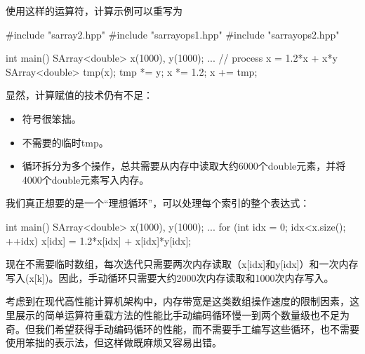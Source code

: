 使用这样的运算符，计算示例可以重写为

\begin{cpp}
#include "sarray2.hpp"
#include "sarrayops1.hpp"
#include "sarrayops2.hpp"

int main() {
	SArray<double> x(1000), y(1000);
	...
	// process x = 1.2*x + x*y
	SArray<double> tmp(x);
	tmp *= y;
	x *= 1.2;
	x += tmp;
}
\end{cpp}

显然，计算赋值的技术仍有不足：

\begin{itemize}
\item 
符号很笨拙。

\item 
不需要的临时tmp。

\item 
循环拆分为多个操作，总共需要从内存中读取大约6000个double元素，并将4000个double元素写入内存。
\end{itemize}

我们真正想要的是一个“理想循环”，可以处理每个索引的整个表达式：

\begin{cpp}
int main() {
	SArray<double> x(1000), y(1000);
	...
	for (int idx = 0; idx<x.size(); ++idx) {
		x[idx] = 1.2*x[idx] + x[idx]*y[idx];
	}
}
\end{cpp}

现在不需要临时数组，每次迭代只需要两次内存读取（x[idx]和y[idx]）和一次内存写入(x[k])。因此，手动循环只需要大约2000次内存读取和1000次内存写入。

考虑到在现代高性能计算机架构中，内存带宽是这类数组操作速度的限制因素，这里展示的简单运算符重载方法的性能比手动编码循环慢一到两个数量级也不足为奇。但我们希望获得手动编码循环的性能，而不需要手工编写这些循环，也不需要使用笨拙的表示法，但这样做既麻烦又容易出错。















